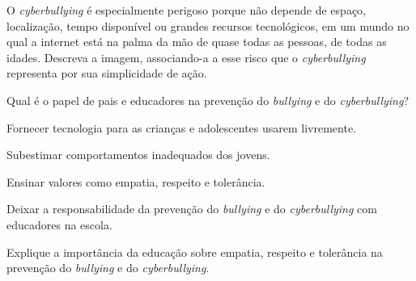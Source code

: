 O {\em cyberbullying} é especialmente perigoso porque não depende de
espaço, localização, tempo disponível ou grandes recursos tecnológicos,
em um mundo no qual a internet está na palma da mão de quase todas as
pessoas, de todas as idades. Descreva a imagem, associando-a a esse
risco que o {\em cyberbullying} representa por sua simplicidade de ação.

\thinrules[n=14,color=Blue2]


\page

\item Qual é o papel de pais e educadores na prevenção do {\em bullying} e
do {\em cyberbullying}?

\startitemize[a][color=Blue2,style=bf]
\item Fornecer tecnologia para as crianças e adolescentes usarem
livremente.

\item Subestimar comportamentos inadequados dos jovens.

 Ensinar valores como empatia, respeito e tolerância.

\item Deixar a responsabilidade da prevenção do {\em bullying} e do
{\em cyberbullying} com educadores na escola.
\stopitemize

\item Explique a importância da educação sobre empatia, respeito e
tolerância na prevenção do {\em bullying} e do {\em cyberbullying}.

